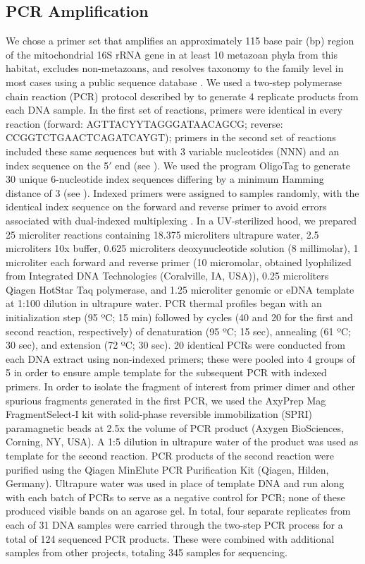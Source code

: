 \documentclass[11pt,letterpaper]{article} %
\begin{document}
\subsection*{PCR Amplification}
We chose a primer set that amplifies an approximately 115 base pair (bp) region of the mitochondrial 16S rRNA gene in at least 10 metazoan phyla from this habitat, excludes non-metazoans, and resolves taxonomy to the family level in most cases using a public sequence database \citep{Kelly2016FMS}.
We used a two-step polymerase chain reaction (PCR) protocol described by \citet{ODonnell2016} to generate 4 replicate products from each DNA sample.
In the first set of reactions, primers were identical in every reaction (forward: AGTTACYYTAGGGATAACAGCG; reverse: CCGGTCTGAACTCAGATCAYGT); primers in the second set of reactions included these same sequences but with 3 variable nucleotides (NNN) and an index sequence on the 5$'$ end (see ). We used the program OligoTag \citep{Coissac2012} to generate 30 unique 6-nucleotide index sequences differing by a minimum Hamming distance of 3 (see ). Indexed primers were assigned to samples randomly, with the identical index sequence on the forward and reverse primer to avoid errors associated with dual-indexed multiplexing \citep{Schnell2015}. In a UV-sterilized hood, we prepared 25 microliter reactions containing 18.375 microliters ultrapure water, 2.5 microliters 10x buffer, 0.625 microliters deoxynucleotide solution (8 millimolar), 1 microliter each forward and reverse primer (10 micromolar, obtained lyophilized from Integrated DNA Technologies (Coralville, IA, USA)), 0.25 microliters Qiagen HotStar Taq polymerase, and 1.25 microliter genomic or eDNA template at 1:100 dilution in ultrapure water. PCR thermal profiles began with an initialization step (95 ºC; 15 min) followed by cycles (40 and 20 for the first and second reaction, respectively) of denaturation (95 ºC; 15 sec), annealing (61 ºC; 30 sec), and extension (72 ºC; 30 sec). 20 identical PCRs were conducted from each DNA extract using non-indexed primers; these were pooled into 4 groups of 5 in order to ensure ample template for the subsequent PCR with indexed primers. In order to isolate the fragment of interest from primer dimer and other spurious fragments generated in the first PCR, we used the AxyPrep Mag FragmentSelect-I kit with solid-phase reversible immobilization (SPRI) paramagnetic beads at 2.5x the volume of PCR product (Axygen BioSciences, Corning, NY, USA). A 1:5 dilution in ultrapure water of the product was used as template for the second reaction. PCR products of the second reaction were purified using the Qiagen MinElute PCR Purification Kit (Qiagen, Hilden, Germany). Ultrapure water was used in place of template DNA and run along with each batch of PCRs to serve as a negative control for PCR; none of these produced visible bands on an agarose gel. In total, four separate replicates from each of 31 DNA samples were carried through the two-step PCR process for a total of 124 sequenced PCR products. These were combined with additional samples from other projects, totaling 345 samples for sequencing.
\end{document}
